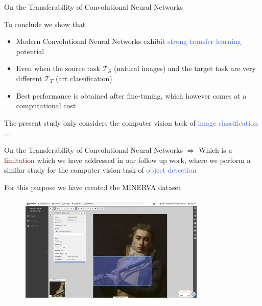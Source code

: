 \documentclass{beamer}
\begin{document}
\begin{frame}{On the Transferability of Convolutional Neural Networks}

	\bigskip

	To conclude we show that
	
	\bigskip

	\begin{itemize}
		\item Modern Convolutional Neural Networks exhibit \textcolor{RoyalBlue}{strong transfer learning} potential
		\item Even when the source task $\mathcal{T}_S$ (natural images) and the target task are very different $\mathcal{T}_T$ (art classification)
		\item Best performance is obtained after fine-tuning, which however comes at a computational cost
	\end{itemize}

	\bigskip

	The present study only considers the computer vision task of \textcolor{RoyalBlue}{image classification} ...

\end{frame}

\begin{frame}{On the Transferability of Convolutional Neural Networks}
	\bigskip
	$\Rightarrow$ Which is a \textcolor{Maroon}{limitation} which we have addressed in our follow up work, where we perform a similar study for the computer vision task of \textcolor{RoyalBlue}{object detection}

	\bigskip
	
	For this purpose we have created the MINERVA dataset

	\begin{figure}
		\includegraphics[width=0.8\textwidth]{figures/cytomine_annotations}
	\end{figure}

\end{frame}
\end{document}
